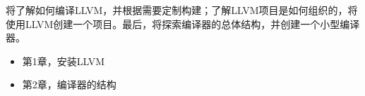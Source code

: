 
将了解如何编译LLVM，并根据需要定制构建；了解LLVM项目是如何组织的，将使用LLVM创建一个项目。最后，将探索编译器的总体结构，并创建一个小型编译器。

\begin{itemize}
\item
第1章，安装LLVM

\item
第2章，编译器的结构
\end{itemize}
